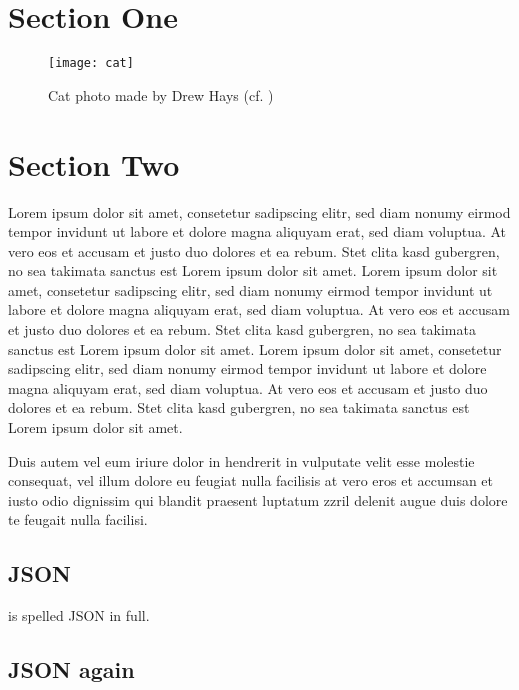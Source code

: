 \section{Section One}
\label{sec:section_one}

\begin{figure}[H]
    \centering
    \texttt{[image: cat]}
    \caption[Cat photo]{Cat photo made by Drew Hays (cf. \cite{Hays_2025})}
    \label{fig:cat}
\end{figure}

\section{Section Two}
\label{sec:section_two}

Lorem ipsum dolor sit amet, consetetur sadipscing elitr, sed diam nonumy eirmod tempor invidunt ut labore et dolore magna aliquyam erat, sed diam voluptua.
At vero eos et accusam et justo duo dolores et ea rebum.
Stet clita kasd gubergren, no sea takimata sanctus est Lorem ipsum dolor sit amet.
Lorem ipsum dolor sit amet, consetetur sadipscing elitr, sed diam nonumy eirmod tempor invidunt ut labore et dolore magna aliquyam erat, sed diam voluptua.
At vero eos et accusam et justo duo dolores et ea rebum.
Stet clita kasd gubergren, no sea takimata sanctus est Lorem ipsum dolor sit amet.
Lorem ipsum dolor sit amet, consetetur sadipscing elitr, sed diam nonumy eirmod tempor invidunt ut labore et dolore magna aliquyam erat, sed diam voluptua.
At vero eos et accusam et justo duo dolores et ea rebum.
Stet clita kasd gubergren, no sea takimata sanctus est Lorem ipsum dolor sit amet.

Duis autem vel eum iriure dolor in hendrerit in vulputate velit esse molestie consequat, vel illum dolore eu feugiat nulla facilisis at vero eros et accumsan et iusto odio dignissim qui blandit praesent luptatum zzril delenit augue duis dolore te feugait nulla facilisi.

\subsection{JSON}
\label{subsec:json}

 is spelled \acl{JSON} in full.

\pagebreak

\subsection{JSON again}
\label{subsec:json_again}

